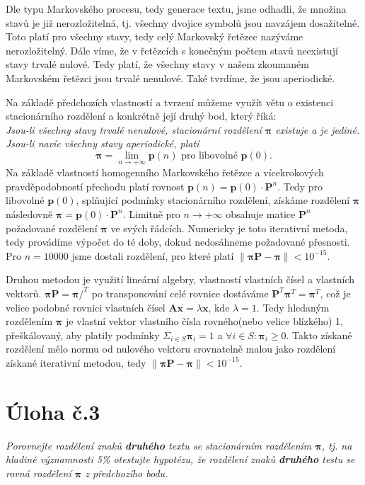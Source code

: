 \documentclass[czech]{mvi-report}
\begin{document}
Dle typu Markovského procesu, tedy generace textu, jsme odhadli, že množina stavů je již nerozložitelná, tj. všechny dvojice symbolů jsou navzájem dosažitelné. Toto platí pro všechny stavy, tedy celý Markovský řetězec nazýváme nerozložitelný. Dále víme, že v řetězcích s konečným počtem stavů neexistují stavy trvalé nulové. Tedy platí, že všechny stavy v našem zkoumaném Markovském řetězci jsou trvalé nenulové. Také tvrdíme, že jsou aperiodické.

Na základě předchozích vlastností a tvrzení můžeme využít větu o existenci stacionárního rozdělení a konkrétně její druhý bod, který říká: \\
\textit{Jsou-li všechny stavy trvalé nenulové, stacionární rozdělení $ \bm{\pi} $ existuje a je jediné.}\\
\textit{Jsou-li navíc všechny stavy aperiodické, platí}
\begin{equation*}
\bm{\pi} = \lim_{n \to +\infty} \bm{p}(n) \textrm{ pro libovolné } \bm{p}(0).
\end{equation*}
Na základě vlastností homogenního Markovského řetězce a vícekrokových pravděpodobností přechodu platí rovnost $ \bm{p}(n) = \bm{p}(0) \cdot \textbf{P}^n $. Tedy pro libovolné $ \bm{p}(0) $, splňující podmínky stacionárního rozdělení, získáme rozdělení $ \bm{\pi} $ následovně $ \bm{\pi} = \bm{p}(0) \cdot \textbf{P}^n $. Limitně pro $ n \to +\infty $ obsahuje matice $ \textbf{P}^n $ požadované rozdělení $ \bm{\pi} $ ve svých řádcích. Numericky je toto iterativní metoda, tedy provádíme výpočet do té doby, dokud nedosáhneme požadované přesnosti. Pro $ n = 10000 $ jsme dostali rozdělení, pro které platí $ \|\bm{\pi}\textbf{P}-\bm{\pi}\| < 10^{-15} $.

Druhou metodou je využití lineární algebry, vlastností vlastních čísel a vlastních vektorů. $ \bm{\pi}\textbf{P}=\bm{\pi} /^T $ po transponování celé rovnice dostáváme $ \textbf{P}^T \bm{\pi}^T = \bm{\pi}^T $, což je velice podobné rovnici vlastních čísel $ \textbf{A}\bm{x} = \lambda \bm{x} $, kde $ \lambda = 1 $. Tedy hledaným rozdělením $ \bm{\pi} $ je vlastní vektor vlastního čísla rovného(nebo velice blízkého) 1, přeškálovaný, aby platily podmínky $ \Sigma_{i \in S} \bm{\pi}_i = 1 $ a $ \forall i \in S: \bm{\pi}_i \geq 0 $. Takto získané rozdělení mělo normu od nulového vektoru srovnatelně malou jako rozdělení získané iterativní metodou, tedy $ \|\bm{\pi}\textbf{P}-\bm{\pi}\| < 10^{-15} $.

\section{Úloha č.3}
\textit{Porovnejte rozdělení znaků  \textbf{druhého} textu se stacionárním rozdělením $ \bm{\pi} $, tj. na hladině významnosti 5\% otestujte hypotézu, že rozdělení znaků \textbf{druhého} testu se rovná rozdělení $ \bm{\pi} $ z předchozího bodu.}\\
\end{document}
